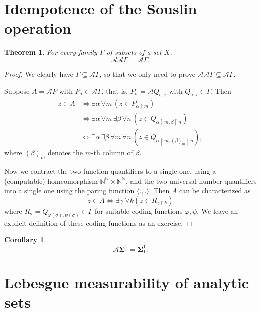 \documentclass{article}
\newcommand{\bSigma}{\pmb{\Sigma}}
\newcommand{\Baire}{\Nat^{\Nat}}
\newcommand{\Rest}[1]{\upharpoonright{#1}}
\newcommand{\Tup}[1]{\langle #1 \rangle}
\newcommand{\PS}[1]{\bSigma^{1}_{#1}}
\newcommand{\Nat}{\mathbb{N}}
\newtheorem{theorem}{Theorem}[section]
\newtheorem{corollary}{Corollary}[theorem]
\begin{document}
\section{Idempotence of the Souslin operation}

\begin{theorem}\label{thm-idempotent-souslin}For every family ${}\Gamma$ of subsets of a set $X$,
\begin{equation*}
\mathcal{A} \mathcal{A} \Gamma = \mathcal{A} \Gamma.
\end{equation*}
\end{theorem}\begin{proof}We clearly have  $\Gamma \subseteq  \mathcal{A} \Gamma$, so that we only need to prove $\mathcal{A} \mathcal{A} \Gamma \subseteq \mathcal{A} \Gamma$.

Suppose $A = \mathcal{A} P$ with $P_\sigma \in \mathcal{A} \Gamma$, that is, $P_\sigma = \mathcal{A} Q_{\sigma,\tau}$ with $Q_{\sigma,\tau} \in  \Gamma$. Then
\begin{align*}
z \in A & \iff  \exists \alpha  \, \forall m \, (z \in P_{\alpha\Rest{m}})\\
    & \iff  \exists \alpha \, \forall m \, \exists \beta \, \forall n \, (z \in Q_{\alpha\Rest{m},\beta\Rest{n} })\\
    &\iff  \exists \alpha \,  \exists \beta \, \forall m \, \forall n \, (z \in Q_{\alpha\Rest{m},(\beta)_m\Rest{n}}),
\end{align*}
where $(\beta)_m$ denotes the $m$-th column of ${}\beta$.

Now we contract the two function quantifiers to a single one, using a (computable) homeomorphism $\Baire \times \Baire$, and the two universal number quantifiers into a single one using the paring function $\Tup{.,.}$. Then $A$ can be characterized as
\begin{equation*}
z \in A \iff \exists \gamma  \; \forall k (z \in R_{\gamma\Rest{k}})
\end{equation*}
where $R_\sigma = Q_{\varphi(\sigma), \psi(\sigma)} \in \Gamma$ for suitable coding functions $\varphi, \psi$. We leave an explicit definition of these coding functions as an exercise.

\end{proof}\begin{corollary}\label{cor-analytic-souslin-closed}\begin{equation}
\mathcal{A}\PS{1} = \PS{1}.
\end{equation}

\end{corollary}\section{Lebesgue measurability of analytic sets}
\end{document}
